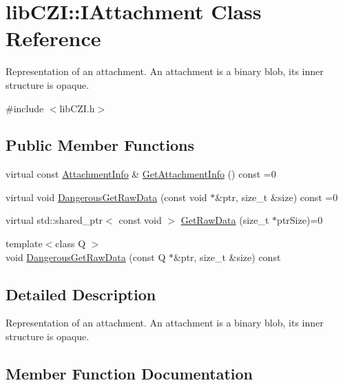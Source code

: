 \hypertarget{classlib_c_z_i_1_1_i_attachment}{}\section{lib\+C\+ZI\+:\+:I\+Attachment Class Reference}
\label{classlib_c_z_i_1_1_i_attachment}


Representation of an attachment. An attachment is a binary blob, its inner structure is opaque.  




{\ttfamily \#include $<$lib\+C\+Z\+I.\+h$>$}

\subsection*{Public Member Functions}
\begin{DoxyCompactItemize}
\item 
virtual const \hyperlink{structlib_c_z_i_1_1_attachment_info}{Attachment\+Info} \& \hyperlink{classlib_c_z_i_1_1_i_attachment_adabcfe4e9a9198fca93445fe22a09c1c}{Get\+Attachment\+Info} () const =0
\item 
virtual void \hyperlink{classlib_c_z_i_1_1_i_attachment_ab809465974cfe7eaf10e171cc1c7bc15}{Dangerous\+Get\+Raw\+Data} (const void $\ast$\&ptr, size\+\_\+t \&size) const =0
\item 
virtual std\+::shared\+\_\+ptr$<$ const void $>$ \hyperlink{classlib_c_z_i_1_1_i_attachment_a123ae7b474e78b44cfbb3e36f2e74fd8}{Get\+Raw\+Data} (size\+\_\+t $\ast$ptr\+Size)=0
\item 
{\footnotesize template$<$class Q $>$ }\\void \hyperlink{classlib_c_z_i_1_1_i_attachment_a2f716dad937d9bc600c27ff33c94dd4e}{Dangerous\+Get\+Raw\+Data} (const Q $\ast$\&ptr, size\+\_\+t \&size) const
\end{DoxyCompactItemize}


\subsection{Detailed Description}
Representation of an attachment. An attachment is a binary blob, its inner structure is opaque. 

\subsection{Member Function Documentation}
\mbox{\label{classlib_c_z_i_1_1_i_attachment_ab809465974cfe7eaf10e171cc1c7bc15}} 
